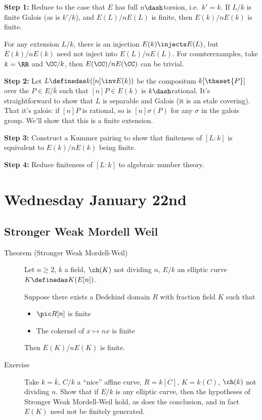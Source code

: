 \textbf{Step 1:} Reduce to the case that \(E\) has full
\(n\dash\)torsion, i.e.~\(k' = k\). If \(L/k\) is finite Galois (as is
\(k'/k\)), and \(E(L)/nE(L)\) is finite, then \(E(k) / nE(k)\) is
finite.

\begin{description}
\tightlist
\item[Remark]
For any extension \(L/k\), there is an injection \(E(k) \injects E(L)\),
but \(E(k) / nE(k)\) need not inject into \(E(L)/n E(L)\). For
counterexamples, take \(k = \RR\) and \(\CC/k\), then
\(E(\CC) / nE(\CC)\) can be trivial.
\end{description}

\textbf{Step 2:} Let \(L\definedas k([n]\inv E(k))\) be the compositum
\(k[\theset{P}]\) over the \(P\in E/\bar k\) such that
\([n] P \in E(k)\) is \(k\dash\)rational. It's straightforward to show
that \(L\) is separable and Galois (it is an etale covering). That it's
galois: if \([n]P\) is rational, so is \([n] \sigma(P)\) for any
\(\sigma\) in the galois group. We'll show that this is a finite
extension.

\textbf{Step 3:} Construct a Kummer pairing to show that finiteness of
\([L: k]\) is equivalent to \(E(k)/nE(k)\) being finite.

\textbf{Step 4:} Reduce finiteness of \([L: k]\) to algebraic number
theory.

\hypertarget{wednesday-january-22nd}{%
\section{Wednesday January 22nd}\label{wednesday-january-22nd}}

\hypertarget{stronger-weak-mordell-weil}{%
\subsection{Stronger Weak Mordell
Weil}\label{stronger-weak-mordell-weil}}

\begin{description}
\item[Theorem (Stronger Weak Mordell-Weil)]
Let \(n\geq 2\), \(k\) a field, \(\ch(K)\) not dividing \(n\), \(E/k\)
an elliptic curve \(K \definedas K(E[n])\).

Suppose there exists a Dedekind domain \(R\) with fraction field \(K\)
such that

\begin{itemize}
\tightlist
\item
  \(\pic R[n]\) is finite
\item
  The cokernel of \(x\mapsto nx\) is finite
\end{itemize}

Then \(E(K)/ n E(K)\) is finite.
\item[Exercise]
Take \(k = \bar k\), \(C/k\) a ``nice'' affine curve, \(R = k[C]\),
\(K = k(C)\), \(\ch(k)\) not dividing \(n\). Show that if \(E/k\) is any
elliptic curve, then the hypotheses of Stronger Weak Mordell-Weil hold,
as does the conclusion, and in fact \(E(K)\) need not be finitely
generated.
\end{description}

